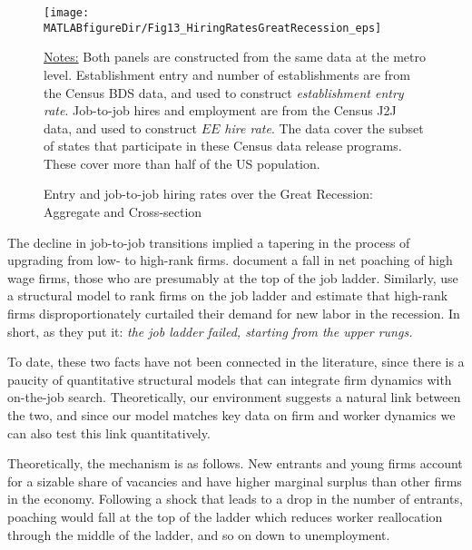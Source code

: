 \begin{figure}[t]
\begin{center}
\hspace*{-0.5cm}\texttt{[image: \\MATLABfigureDir/Fig13\_HiringRatesGreatRecession\_eps]}
\caption{Entry and job-to-job hiring rates over the Great Recession: Aggregate and Cross-section}\label{figure: j2jdata}\vspace*{-0.3cm}
\end{center}
{\footnotesize \underline{Notes:}
Both panels are constructed from the same data at the metro level.
Establishment entry and number of establishments are from the Census BDS data, and used to construct \emph{establishment entry rate}.
Job-to-job hires and employment are from the Census J2J data, and used to construct \emph{$EE$ hire rate}.
The data cover the subset of states that participate in these Census data release programs. These cover more than half of the US population.
}
\end{figure}

The decline in job-to-job transitions implied a tapering in the process of upgrading from low- to high-rank firms.
\citet{HHKM2018} document a fall in net poaching of high wage firms, those who are presumably at the top of the job ladder.
Similarly, \citet{moscapv} use a structural model to rank firms on the job ladder and estimate that high-rank firms disproportionately curtailed their demand for new labor in the recession.
In short, as they put it: \emph {the job ladder failed, starting from the upper rungs.}

To date, these two facts have not been connected in the literature, since there is a paucity of quantitative structural models that can integrate firm dynamics with on-the-job search.
Theoretically, our environment suggests a natural link between the two, and since our model matches key data on firm and worker dynamics we can also test this link quantitatively.

Theoretically, the mechanism is as follows.
New entrants and young firms account for a sizable share of vacancies and have higher marginal surplus than other firms in the economy.
Following a shock that leads to a drop in the number of entrants, poaching would fall at the top of the ladder which reduces worker reallocation through the middle of the ladder, and so on down to unemployment.

